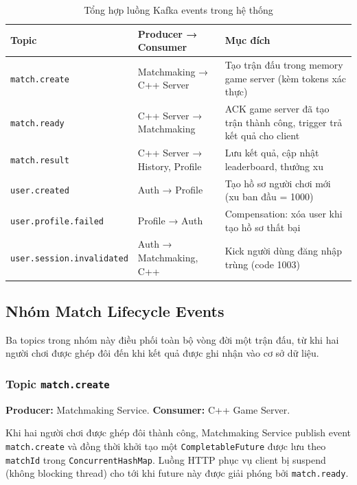 \documentclass[12pt,a4paper]{report}
\newcommand{\topic}[1]{\texttt{\textcolor{micropurple}{#1}}}
\begin{document}
\begin{table}[H]
\centering
\caption{Tổng hợp luồng Kafka events trong hệ thống}
\label{tab:kafkaevents}
\begin{tabularx}{\textwidth}{llX}
\toprule
\textbf{Topic} & \textbf{Producer → Consumer} & \textbf{Mục đích} \\
\midrule
\topic{match.create}          & Matchmaking → C++ Server & Tạo trận đấu trong memory game server (kèm tokens xác thực) \\
\topic{match.ready}           & C++ Server → Matchmaking & ACK game server đã tạo trận thành công, trigger trả kết quả cho client \\
\topic{match.result}          & C++ Server → History, Profile & Lưu kết quả, cập nhật leaderboard, thưởng xu \\
\topic{user.created}          & Auth → Profile & Tạo hồ sơ người chơi mới (xu ban đầu = 1000) \\
\topic{user.profile.failed}   & Profile → Auth & Compensation: xóa user khi tạo hồ sơ thất bại \\
\topic{user.session.invalidated} & Auth → Matchmaking, C++ & Kick người dùng đăng nhập trùng (code 1003) \\
\bottomrule
\end{tabularx}
\end{table}

\subsection{Nhóm Match Lifecycle Events}

Ba topics trong nhóm này điều phối toàn bộ vòng đời một trận đấu, từ khi hai người chơi
được ghép đôi đến khi kết quả được ghi nhận vào cơ sở dữ liệu.

\subsubsection{Topic \texttt{match.create}}

\textbf{Producer:} Matchmaking Service. \quad \textbf{Consumer:} C++ Game Server.

Khi hai người chơi được ghép đôi thành công, Matchmaking Service publish event
\topic{match.create} và đồng thời khởi tạo một \texttt{CompletableFuture} được lưu theo
\texttt{matchId} trong \texttt{ConcurrentHashMap}. Luồng HTTP phục vụ client bị suspend
(không blocking thread) cho tới khi future này được giải phóng bởi \topic{match.ready}.
\end{document}
